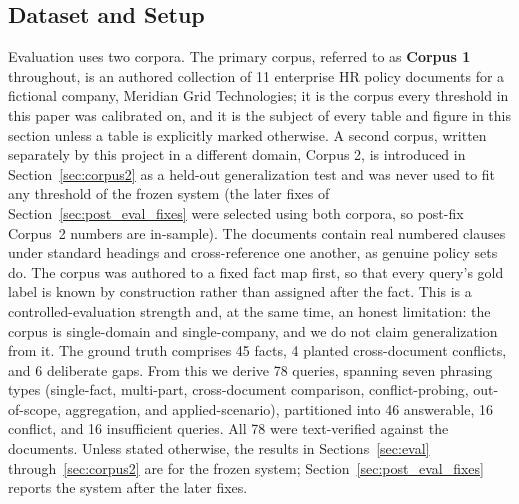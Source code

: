 \documentclass[conference]{IEEEtran}
\begin{document}
\subsection{Dataset and Setup}
Evaluation uses two corpora. The primary corpus, referred to as
\textbf{Corpus 1} throughout, is an authored collection of 11 enterprise HR
policy documents for a fictional company, Meridian Grid Technologies; it is
the corpus every threshold in this paper was calibrated on, and it is the
subject of every table and figure in this section unless a table is
explicitly marked otherwise. A second corpus, written separately by this
project in a different domain, Corpus 2, is introduced in
Section~\ref{sec:corpus2} as a held-out generalization test and was never
used to fit any threshold of the frozen system (the later fixes of
Section~\ref{sec:post_eval_fixes} were selected using both corpora, so
post-fix Corpus~2 numbers are in-sample). The documents contain real
numbered clauses under standard headings and cross-reference one another, as
genuine policy sets do. The corpus was authored to a fixed fact map first,
so that every query's gold label is known by construction rather than
assigned after the fact. This is a controlled-evaluation strength and, at
the same time, an honest limitation: the corpus is single-domain and
single-company, and we do not claim generalization from it. The ground
truth comprises 45 facts, 4 planted cross-document conflicts, and 6
deliberate gaps. From this we derive 78 queries, spanning seven phrasing
types (single-fact, multi-part, cross-document comparison, conflict-probing,
out-of-scope, aggregation, and applied-scenario), partitioned into 46
answerable, 16 conflict, and 16 insufficient queries. All 78 were
text-verified against the documents. Unless stated otherwise, the results in
Sections~\ref{sec:eval} through~\ref{sec:corpus2} are for the frozen system;
Section~\ref{sec:post_eval_fixes} reports the system after the later fixes.
\end{document}
